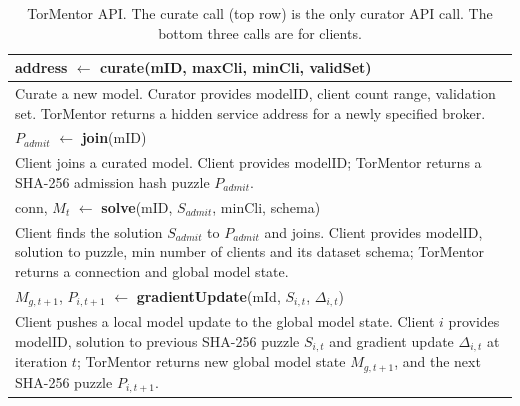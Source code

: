 
\begin{table}[h]
\begin{tabular}{p{\textwidth}}
 \hline
 address $\leftarrow$ \textbf{curate}(mID, maxCli, minCli, validSet) \\
 \hline
 Curate a new model. Curator provides modelID,  
 client count range, validation set. TorMentor returns a hidden
 service address for a newly specified broker. \\
 \hline\hline
 \hline\hline
 $P_{admit}$ $\leftarrow$ \textbf{join}(mID) \\
 \hline
 Client joins a curated model. Client provides modelID; TorMentor returns
 a SHA-256 admission hash puzzle $P_{admit}$.                          
 \\
 \hline\hline
 conn, $M_t$ $\leftarrow$ \textbf{solve}(mID, $S_{admit}$, minCli, schema) \\
 \hline
 Client finds the solution $S_{admit}$ to $P_{admit}$ and joins. Client
 provides modelID, solution to puzzle, min number of clients and its
 dataset schema; TorMentor returns a connection and global model state.
 \\
 \hline\hline
 $M_{g,t+1}$, $P_{i,t+1}$ $\leftarrow$ \textbf{gradientUpdate}(mId, $S_
 {i,t}$, $\Delta_{i,t}$) \\
 \hline
 Client pushes a local model update to the global model state. Client $i$
 provides modelID, solution to previous SHA-256 puzzle $S_{i,t}$ and
 gradient update $\Delta_{i,t}$ at iteration $t$; TorMentor returns new
 global model state $M_{g,t+1}$, and the next SHA-256 puzzle $P_
 {i,t+1}$. \\
\end{tabular} 
\caption{TorMentor API. The curate call (top row) is the only curator
  API call. The bottom three calls are for clients.\label{tab:API} }
\end{table}

